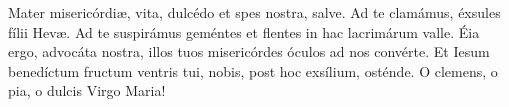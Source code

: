 Mater misericórdi{\ae}, vita, dulcédo et spes nostra, salve. Ad te clamámus, éxsules fílii Hev{\ae}.
Ad te suspirámus geméntes et flentes in hac lacrimárum valle. Éia ergo, advocáta nostra, illos tuos misericórdes óculos ad nos convérte.
Et Iesum benedíctum fructum ventris tui, nobis, post hoc exsílium, osténde. O clemens, o pia, o dulcis Virgo Maria!